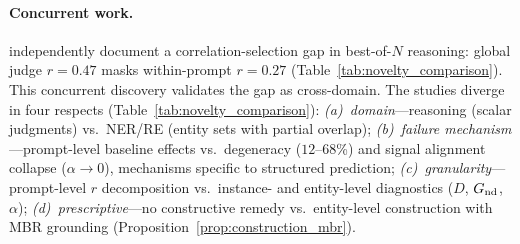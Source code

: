 \paragraph{Concurrent work.}
\citet{landesberg2026bon} independently document a correlation-selection gap in best-of-$N$ reasoning: global judge $r{=}0.47$ masks within-prompt $r{=}0.27$ (Table~\ref{tab:novelty_comparison}).
This concurrent discovery validates the gap as cross-domain.
The studies diverge in four respects (Table~\ref{tab:novelty_comparison}):
\textit{(a)~domain}---reasoning (scalar judgments) vs.\ NER/RE (entity sets with partial overlap);
\textit{(b)~failure mechanism}---prompt-level baseline effects vs.\ degeneracy ($12$--$68$\%) and signal alignment collapse ($\alpha{\to}0$), mechanisms specific to structured prediction;
\textit{(c)~granularity}---prompt-level $r$ decomposition vs.\ instance- and entity-level diagnostics ($D$, $G_{\textup{nd}}$, $\alpha$);
\textit{(d)~prescriptive}---no constructive remedy vs.\ entity-level construction with MBR grounding (Proposition~\ref{prop:construction_mbr}).
